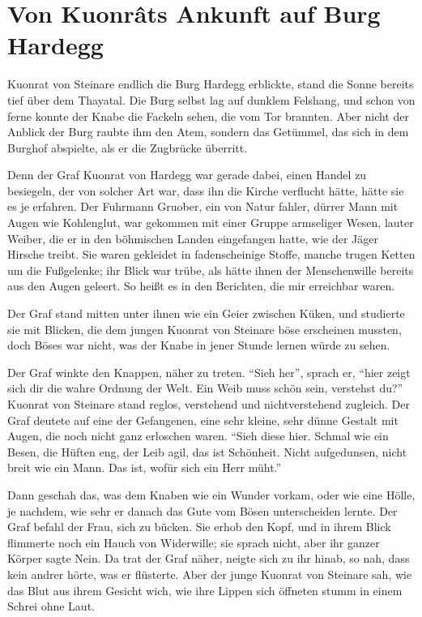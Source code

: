 
\section{Von Kuonr\^{a}ts Ankunft auf Burg Hardegg}

 \gls{Kuonrat von Steinare} endlich die Burg \gls{Hardegg} erblickte, stand die Sonne bereits tief über dem Thayatal. Die Burg selbst lag auf dunklem Felshang, und schon von ferne konnte der Knabe die Fackeln sehen, die vom Tor brannten. Aber nicht der Anblick der Burg raubte ihm den Atem, sondern das Getümmel, das sich in dem Burghof abspielte, als er die Zugbrücke überritt.

Denn der Graf \gls{Kuonrat von Hardegg} war gerade dabei, einen Handel zu besiegeln, der von solcher Art war, dass ihn die Kirche verflucht hätte, hätte sie es je erfahren. Der Fuhrmann \gls{Gruober}, ein von Natur fahler, dürrer Mann mit Augen wie Kohlenglut, war gekommen mit einer Gruppe armseliger Wesen, lauter Weiber, die er in den böhmischen Landen eingefangen hatte, wie der Jäger Hirsche treibt. Sie waren gekleidet in fadenscheinige Stoffe, manche trugen Ketten um die Fußgelenke; ihr Blick war trübe, als hätte ihnen der Menschenwille bereits aus den Augen geleert. So heißt es in den Berichten, die mir erreichbar waren.

Der Graf stand mitten unter ihnen wie ein Geier zwischen Küken, und studierte sie mit Blicken, die dem jungen \gls{Kuonrat von Steinare} böse erscheinen mussten, doch Böses war nicht, was der Knabe in jener Stunde lernen würde zu sehen.

Der Graf winkte den Knappen, näher zu treten. \enquote{Sieh her}, sprach er, \enquote{hier zeigt sich dir die wahre Ordnung der Welt. Ein Weib muss schön sein, verstehst du?} \gls{Kuonrat von Steinare} stand reglos, verstehend und nichtverstehend zugleich. Der Graf deutete auf eine der Gefangenen, eine sehr kleine, sehr dünne Gestalt mit Augen, die noch nicht ganz erloschen waren. \enquote{Sieh diese hier. Schmal wie ein Besen, die Hüften eng, der Leib agil, das ist Schönheit. Nicht aufgedunsen, nicht breit wie ein Mann. Das ist, wofür sich ein Herr müht.}

Dann geschah das, was dem Knaben wie ein Wunder vorkam, oder wie eine Hölle, je nachdem, wie sehr er danach das Gute vom Bösen unterscheiden lernte. Der Graf befahl der Frau, sich zu bücken. Sie erhob den Kopf, und in ihrem Blick flimmerte noch ein Hauch von Widerwille; sie sprach nicht, aber ihr ganzer Körper sagte Nein. Da trat der Graf näher, neigte sich zu ihr hinab, so nah, dass kein andrer hörte, was er flüsterte. Aber der junge \gls{Kuonrat von Steinare} sah, wie das Blut aus ihrem Gesicht wich, wie ihre Lippen sich öffneten stumm in einem Schrei ohne Laut.

